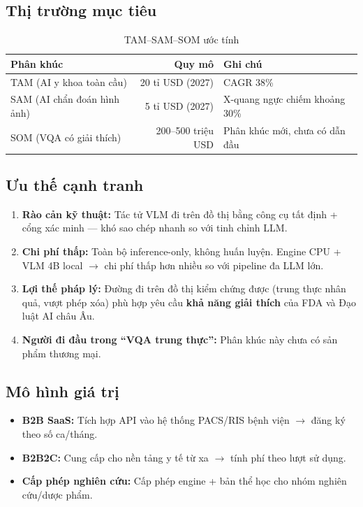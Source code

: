 \documentclass[11pt,a4paper]{article}
\begin{document}
\subsection{Thị trường mục tiêu}

\begin{table}[H]
\centering\small
\begin{tabular}{l r l}
\toprule
\textbf{Phân khúc} & \textbf{Quy mô} & \textbf{Ghi chú} \\
\midrule
TAM (AI y khoa toàn cầu) & 20 tỉ USD (2027) & CAGR 38\% \\
SAM (AI chẩn đoán hình ảnh) & 5 tỉ USD (2027) & X-quang ngực chiếm khoảng 30\% \\
SOM (VQA có giải thích) & 200--500 triệu USD & Phân khúc mới, chưa có dẫn đầu \\
\bottomrule
\end{tabular}
\caption{TAM--SAM--SOM ước tính}
\end{table}

\subsection{Ưu thế cạnh tranh}

\begin{enumerate}[leftmargin=1.5em]
  \item \textbf{Rào cản kỹ thuật:} Tác tử VLM đi trên đồ thị bằng công cụ tất định + cổng xác minh --- khó sao chép nhanh so với tinh chỉnh LLM.
  \item \textbf{Chi phí thấp:} Toàn bộ inference-only, không huấn luyện. Engine CPU + VLM 4B local $\to$ chi phí thấp hơn nhiều so với pipeline đa LLM lớn.
  \item \textbf{Lợi thế pháp lý:} Đường đi trên đồ thị kiểm chứng được (trung thực nhân quả, vượt phép xóa) phù hợp yêu cầu \textbf{khả năng giải thích} của FDA và Đạo luật AI châu Âu.
  \item \textbf{Người đi đầu trong ``VQA trung thực'':} Phân khúc này chưa có sản phẩm thương mại.
\end{enumerate}

\subsection{Mô hình giá trị}

\begin{itemize}[leftmargin=1.5em]
  \item \textbf{B2B SaaS:} Tích hợp API vào hệ thống PACS/RIS bệnh viện $\to$ đăng ký theo số ca/tháng.
  \item \textbf{B2B2C:} Cung cấp cho nền tảng y tế từ xa $\to$ tính phí theo lượt sử dụng.
  \item \textbf{Cấp phép nghiên cứu:} Cấp phép engine + bản thể học cho nhóm nghiên cứu/dược phẩm.
\end{itemize}
\end{document}
